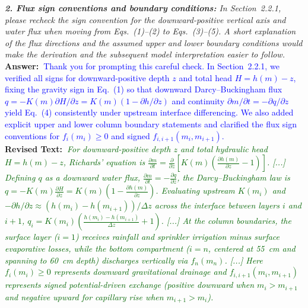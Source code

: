 \documentclass[10pt]{article}
\newcommand{\query}[2][]{\ifthenelse{\equal{#1}{}}{}{\textbf{#1:}~}\emph{#2}}
\newcommand{\ans}[1]{\textbf{Answer:~}#1}
\newcommand{\Rtext}[1]{\textbf{Revised Text:~}#1}
\begin{document}
\query[R-2.2]{\textbf{2. Flux sign conventions and boundary conditions:} In Section~2.2.1, please recheck the sign convention for the downward-positive vertical axis and water flux when moving from Eqs.~(1)--(2) to Eqs.~(3)--(5). A short explanation of the flux directions and the assumed upper and lower boundary conditions would make the derivation and the subsequent model interpretation easier to follow.}\\
\ans{\textcolor{blue}{Thank you for prompting this careful check. In Section~2.2.1, we verified all signs for downward-positive depth $z$ and total head $H = h(m) - z$, fixing the gravity sign in Eq.~(1) so that downward Darcy--Buckingham flux $q = -K(m)\partial H/\partial z = K(m)(1 - \partial h/\partial z)$ and continuity $\partial m/\partial t = -\partial q/\partial z$ yield Eq.~(4) consistently under upstream interface differencing. We also added explicit upper and lower column boundary statements and clarified the flux sign conventions for $f_i(m_i) \ge 0$ and signed $f_{i,i+1}(m_i, m_{i+1})$.}}\\
\Rtext{\emph{\textcolor{darkgreen}{For downward-positive depth $z$ and total hydraulic head $H = h(m) - z$, Richards' equation is $\frac{\partial m}{\partial t} = \frac{\partial}{\partial z}\left[K(m)\left(\frac{\partial h(m)}{\partial z} - 1\right)\right]$. [...] Defining $q$ as a downward water flux, $\frac{\partial m}{\partial t} = -\frac{\partial q}{\partial z}$, the Darcy--Buckingham law is $q = -K(m)\frac{\partial H}{\partial z} = K(m)\left(1 - \frac{\partial h(m)}{\partial z}\right)$. Evaluating upstream $K(m_i)$ and $-\partial h/\partial z \approx (h(m_i)-h(m_{i+1}))/\Delta z$ across the interface between layers $i$ and $i+1$, $q_i = K(m_i)\left(\frac{h(m_i)-h(m_{i+1})}{\Delta z}+1\right)$. [...] At the column boundaries, the surface layer ($i=1$) receives rainfall and sprinkler irrigation minus surface evaporative losses, while the bottom compartment ($i=n$, centered at \SI{55}{cm} and spanning to \SI{60}{cm} depth) discharges vertically via $f_n(m_n)$. [...] Here $f_i(m_i) \ge 0$ represents downward gravitational drainage and $f_{i,i+1}(m_i, m_{i+1})$ represents signed potential-driven exchange (positive downward when $m_i > m_{i+1}$ and negative upward for capillary rise when $m_{i+1} > m_i$).}}}
\end{document}

